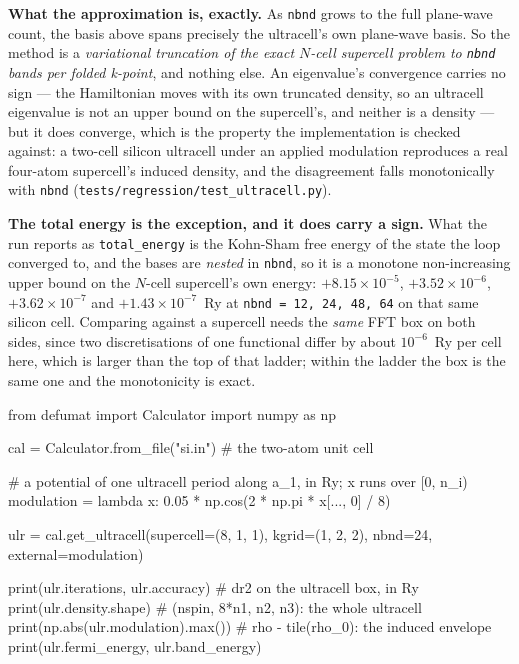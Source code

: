 \documentclass[11pt,a4paper]{article}
\newcommand{\code}[1]{\texttt{\small #1}}
\begin{document}
\textbf{What the approximation is, exactly.} As \code{nbnd} grows to the full
plane-wave count, the basis above spans precisely the ultracell's own
plane-wave basis. So the method is a \emph{variational truncation of the exact
$N$-cell supercell problem to \code{nbnd} bands per folded k-point}, and
nothing else. An eigenvalue's convergence carries no sign --- the Hamiltonian
moves with its own truncated density, so an ultracell eigenvalue is not an
upper bound on the supercell's, and neither is a density --- but it does
converge, which is the property the implementation is checked against: a
two-cell silicon ultracell under an applied modulation reproduces a real
four-atom supercell's induced density, and the disagreement falls monotonically
with \code{nbnd} (\code{tests/regression/test\_ultracell.py}).

\textbf{The total energy is the exception, and it does carry a sign.} What the
run reports as \code{total\_energy} is the Kohn-Sham free energy of the state
the loop converged to, and the bases are \emph{nested} in \code{nbnd}, so it is
a monotone non-increasing upper bound on the $N$-cell supercell's own energy:
$+8.15\times10^{-5}$, $+3.52\times10^{-6}$, $+3.62\times10^{-7}$ and
$+1.43\times10^{-7}$~Ry at \code{nbnd = 12, 24, 48, 64} on that same silicon
cell. Comparing against a supercell needs the \emph{same} FFT box on both
sides, since two discretisations of one functional differ by about
$10^{-6}$~Ry per cell here, which is larger than the top of that ladder; within
the ladder the box is the same one and the monotonicity is exact.

\begin{pycode}
from defumat import Calculator
import numpy as np

cal = Calculator.from_file("si.in")        # the two-atom unit cell

# a potential of one ultracell period along a_1, in Ry; x runs over [0, n_i)
modulation = lambda x: 0.05 * np.cos(2 * np.pi * x[..., 0] / 8)

ulr = cal.get_ultracell(supercell=(8, 1, 1), kgrid=(1, 2, 2),
                        nbnd=24, external=modulation)

print(ulr.iterations, ulr.accuracy)    # dr2 on the ultracell box, in Ry
print(ulr.density.shape)               # (nspin, 8*n1, n2, n3): the whole ultracell
print(np.abs(ulr.modulation).max())    # rho - tile(rho_0): the induced envelope
print(ulr.fermi_energy, ulr.band_energy)
\end{pycode}
\end{document}
